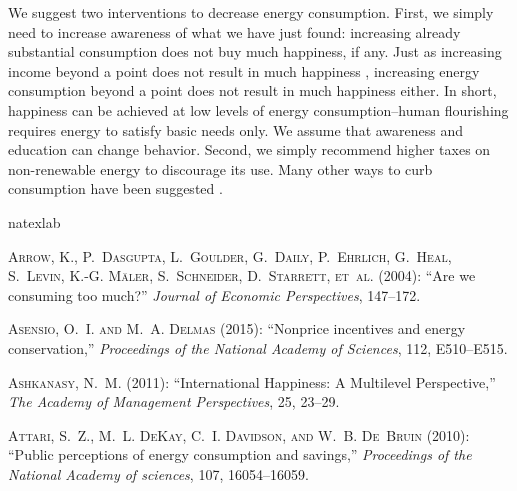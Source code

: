 \documentclass[10pt, letterpaper]{article}
\begin{document}
\begin{spacing}{1.5}
We suggest two interventions to decrease energy consumption. First, we simply
need to increase awareness of what we have just found: increasing
already substantial consumption does not buy much happiness, if any. Just as increasing  income
 beyond a point does not result in much happiness \citep{kahneman10}, increasing
 energy consumption beyond a point does not result in much happiness
 either. %
  In short, happiness can be achieved at low
 levels of energy consumption--human flourishing requires energy to satisfy
 basic needs only. We assume that awareness and education can change behavior.
 Second, we simply recommend higher taxes on non-renewable
 energy to discourage its use. Many other ways to
 curb consumption have been suggested \citep{dietz14B,dietz15,asensio15, dumas87,attari10}.





\newpage %
%

\begin{thebibliography}{52}
\newcommand{\enquote}[1]{``#1''}
\expandafter\ifx\csname natexlab\endcsname\relax\def\natexlab#1{#1}\fi

\textsc{Arrow, K., P.~Dasgupta, L.~Goulder, G.~Daily, P.~Ehrlich, G.~Heal,
  S.~Levin, K.-G. M{\"a}ler, S.~Schneider, D.~Starrett, et~al.} (2004):
  \enquote{Are we consuming too much?} \emph{Journal of Economic Perspectives},
  147--172.

\textsc{Asensio, O.~I. and M.~A. Delmas} (2015): \enquote{Nonprice incentives
  and energy conservation,} \emph{Proceedings of the National Academy of
  Sciences}, 112, E510--E515.

\textsc{Ashkanasy, N.~M.} (2011): \enquote{International Happiness: A
  Multilevel Perspective,} \emph{The Academy of Management Perspectives}, 25,
  23--29.

\textsc{Attari, S.~Z., M.~L. DeKay, C.~I. Davidson, and W.~B. De~Bruin} (2010):
  \enquote{Public perceptions of energy consumption and savings,}
  \emph{Proceedings of the National Academy of sciences}, 107, 16054--16059.


\end{thebibliography}
\end{spacing}
\end{document}
